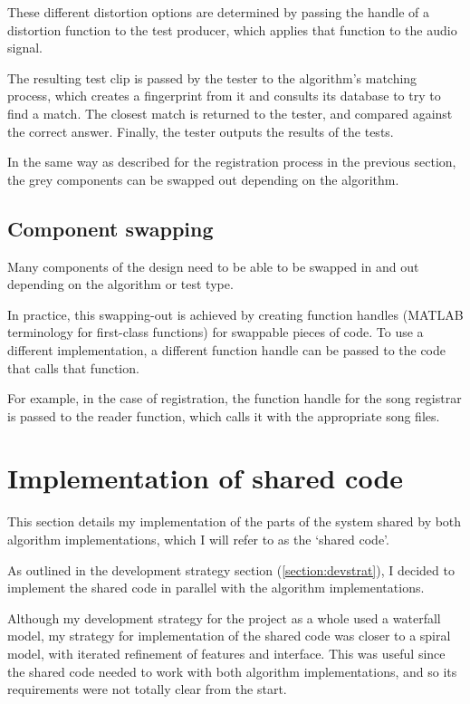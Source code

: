 \documentclass[12pt,a4paper,twoside,openright]{report}
\begin{document}
These different distortion options are determined by passing the handle of a distortion function to the test producer, which applies that function to the audio signal.

The resulting test clip is passed by the tester to the algorithm's matching process, which creates a fingerprint from it and consults its database to try to find a match. The closest match is returned to the tester, and compared against the correct answer. Finally, the tester outputs the results of the tests.

In the same way as described for the registration process in the previous section, the grey components can be swapped out depending on the algorithm.


\subsection{Component swapping}

Many components of the design need to be able to be swapped in and out depending on the algorithm or test type. 

In practice, this swapping-out is achieved by creating function handles (MATLAB terminology for first-class functions) for swappable pieces of code. To use a different implementation, a different function handle can be passed to the code that calls that function.

For example, in the case of registration, the function handle for the song registrar is passed to the reader function, which calls it with the appropriate song files.


\section{Implementation of shared code}
\label{section:sharedimpl}

This section details my implementation of the parts of the system shared by both algorithm implementations, which I will refer to as the `shared code'.

As outlined in the development strategy section (\ref{section:devstrat}), I decided to implement the shared code in parallel with the algorithm implementations.

Although my development strategy for the project as a whole used a waterfall model, my strategy for implementation of the shared code was closer to a spiral model, with iterated refinement of features and interface. This was useful since the shared code needed to work with both algorithm implementations, and so its requirements were not totally clear from the start. 
\end{document}
